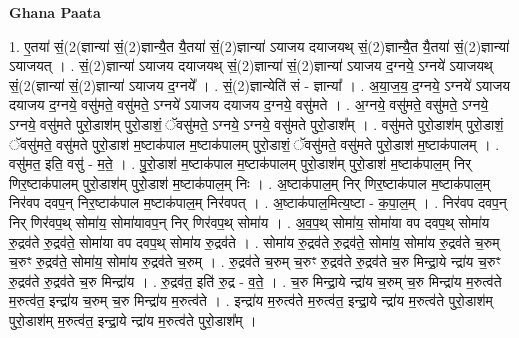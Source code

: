 \documentclass[17pt]{extarticle}
\begin{document}
\textbf{Ghana Paata } \newline

1. ए॒तया॑ सं॒(2(ज्ञान्या॑ सं॒(2)ज्ञान्यै॒त यै॒तया॑ सं॒(2)ज्ञान्या॑ ऽयाजय दयाजयथ् सं॒(2)ज्ञान्यै॒त यै॒तया॑ सं॒(2)ज्ञान्या॑ ऽयाजयत् । . सं॒(2)ज्ञान्या॑ ऽयाजय दयाजयथ् सं॒(2)ज्ञान्या॑ सं॒(2)ज्ञान्या॑ ऽयाजय द॒ग्नये॒ ऽग्नये॑ ऽयाजयथ् सं॒(2(ज्ञान्या॑ 
सं॒(2)ज्ञान्या॑ ऽयाजय द॒ग्नये᳚ । . सं॒(2)ज्ञान्येति॑ सं - ज्ञान्या᳚ । . अ॒या॒ज॒य॒ द॒ग्नये॒ ऽग्नये॑ ऽयाजय दयाजय द॒ग्नये॒ वसु॑मते॒ वसु॑मते॒ ऽग्नये॑ ऽयाजय दयाजय द॒ग्नये॒ वसु॑मते । . अ॒ग्नये॒ वसु॑मते॒ वसु॑मते॒ ऽग्नये॒ ऽग्नये॒ वसु॑मते पुरो॒डाश॑म् पुरो॒डाशं॒ ॅवसु॑मते॒ ऽग्नये॒ ऽग्नये॒ वसु॑मते पुरो॒डाश᳚म् । . वसु॑मते पुरो॒डाश॑म् पुरो॒डाशं॒ ॅवसु॑मते॒ वसु॑मते पुरो॒डाश॑ म॒ष्टाक॑पाल म॒ष्टाक॑पालम् पुरो॒डाशं॒ ॅवसु॑मते॒ वसु॑मते पुरो॒डाश॑ म॒ष्टाक॑पालम् । . वसु॑मत॒ इति॒ वसु॑ - म॒ते॒ । . पु॒रो॒डाश॑ म॒ष्टाक॑पाल म॒ष्टाक॑पालम् पुरो॒डाश॑म् पुरो॒डाश॑ म॒ष्टाक॑पाल॒म् निर् णिर॒ष्टाक॑पालम् पुरो॒डाश॑म् पुरो॒डाश॑ म॒ष्टाक॑पाल॒म् निः । . अ॒ष्टाक॑पाल॒म् निर् णिर॒ष्टाक॑पाल म॒ष्टाक॑पाल॒म् निर॑वप दवप॒न् निर॒ष्टाक॑पाल म॒ष्टाक॑पाल॒म् निर॑वपत् । . अ॒ष्टाक॑पाल॒मित्य॒ष्टा - क॒पा॒ल॒म् । . निर॑वप दवप॒न् निर् णिर॑वप॒थ् सोमा॑य॒ सोमा॑यावप॒न् निर् णिर॑वप॒थ् सोमा॑य । . अ॒व॒प॒थ् सोमा॑य॒ सोमा॑या वप दवप॒थ् सोमा॑य रु॒द्रव॑ते रु॒द्रव॑ते॒ सोमा॑या वप दवप॒थ् सोमा॑य रु॒द्रव॑ते । . सोमा॑य रु॒द्रव॑ते रु॒द्रव॑ते॒ सोमा॑य॒ सोमा॑य रु॒द्रव॑ते च॒रुम् च॒रुꣳ रु॒द्रव॑ते॒ सोमा॑य॒ सोमा॑य रु॒द्रव॑ते च॒रुम् । . रु॒द्रव॑ते च॒रुम् च॒रुꣳ रु॒द्रव॑ते रु॒द्रव॑ते च॒रु मिन्द्रा॒ये न्द्रा॑य च॒रुꣳ रु॒द्रव॑ते रु॒द्रव॑ते च॒रु मिन्द्रा॑य । . रु॒द्रव॑त॒ इति॑ रु॒द्र - व॒ते॒ । . च॒रु मिन्द्रा॒ये न्द्रा॑य च॒रुम् च॒रु मिन्द्रा॑य म॒रुत्व॑ते म॒रुत्व॑त॒ इन्द्रा॑य च॒रुम् च॒रु मिन्द्रा॑य म॒रुत्व॑ते । . इन्द्रा॑य म॒रुत्व॑ते म॒रुत्व॑त॒ इन्द्रा॒ये न्द्रा॑य म॒रुत्व॑ते पुरो॒डाश॑म् पुरो॒डाश॑म् म॒रुत्व॑त॒ इन्द्रा॒ये न्द्रा॑य म॒रुत्व॑ते पुरो॒डाश᳚म् । \newline
\end{document}
